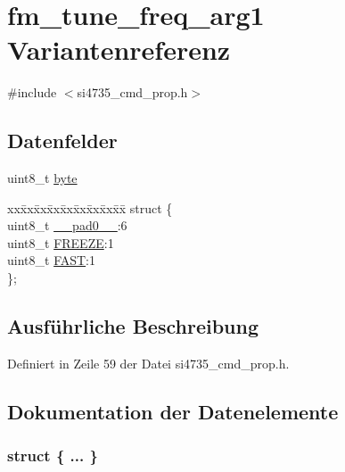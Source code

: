 \hypertarget{unionfm__tune__freq__arg1}{}\section{fm\+\_\+tune\+\_\+freq\+\_\+arg1 Variantenreferenz}
\label{unionfm__tune__freq__arg1}


{\ttfamily \#include $<$si4735\+\_\+cmd\+\_\+prop.\+h$>$}

\subsection*{Datenfelder}
\begin{DoxyCompactItemize}
\item 
uint8\+\_\+t \hyperlink{unionfm__tune__freq__arg1_a96f44d20f1dbf1c8785a7bc99a46164c}{byte}
\item 
\begin{tabbing}
xx\=xx\=xx\=xx\=xx\=xx\=xx\=xx\=xx\=\kill
struct \{\\
\>uint8\_t \hyperlink{unionfm__tune__freq__arg1_a8b4eebe79ded0459acec2f4950102ba3}{\_\_pad0\_\_}:6\\
\>uint8\_t \hyperlink{unionfm__tune__freq__arg1_af55f9b26a88028338a2a761649cf5407}{FREEZE}:1\\
\>uint8\_t \hyperlink{unionfm__tune__freq__arg1_a9c324e733ff424944c675beaff57049d}{FAST}:1\\
\}; \\

\end{tabbing}\end{DoxyCompactItemize}


\subsection{Ausführliche Beschreibung}


Definiert in Zeile 59 der Datei si4735\+\_\+cmd\+\_\+prop.\+h.



\subsection{Dokumentation der Datenelemente}
\hypertarget{unionfm__tune__freq__arg1_af053baab78e2451164efc849f824b4da}{}\subsubsection[{"@5}]{\setlength{\rightskip}{0pt plus 5cm}struct \{ ... \} }\label{unionfm__tune__freq__arg1_af053baab78e2451164efc849f824b4da}
\hypertarget{unionfm__tune__freq__arg1_a8b4eebe79ded0459acec2f4950102ba3}{}
